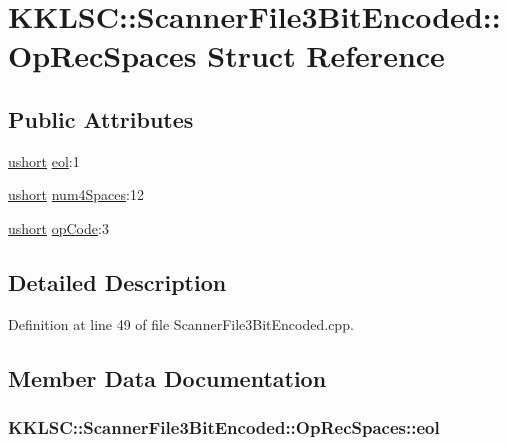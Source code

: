 \hypertarget{struct_scanner_file3_bit_encoded_1_1_op_rec_spaces}{}\section{K\+K\+L\+SC\+:\+:Scanner\+File3\+Bit\+Encoded\+:\+:Op\+Rec\+Spaces Struct Reference}
\label{struct_scanner_file3_bit_encoded_1_1_op_rec_spaces}
\subsection*{Public Attributes}
\begin{DoxyCompactItemize}
\item 
\hyperlink{namespace_k_k_b_a4a7e2d1bab49f38edf25c38a8dc20012}{ushort} \hyperlink{struct_scanner_file3_bit_encoded_1_1_op_rec_spaces_a4d5c1364eb376592c8ef8a034b5bb035}{eol}\+:1
\item 
\hyperlink{namespace_k_k_b_a4a7e2d1bab49f38edf25c38a8dc20012}{ushort} \hyperlink{struct_scanner_file3_bit_encoded_1_1_op_rec_spaces_a02cd8c9ab9c259c880cee43e42191ad8}{num4\+Spaces}\+:12
\item 
\hyperlink{namespace_k_k_b_a4a7e2d1bab49f38edf25c38a8dc20012}{ushort} \hyperlink{struct_scanner_file3_bit_encoded_1_1_op_rec_spaces_a5dd363615637cd86f604ee963e5665da}{op\+Code}\+:3
\end{DoxyCompactItemize}


\subsection{Detailed Description}


Definition at line 49 of file Scanner\+File3\+Bit\+Encoded.\+cpp.



\subsection{Member Data Documentation}
\subsubsection[{\texorpdfstring{eol}{eol}}]{ K\+K\+L\+S\+C\+::\+Scanner\+File3\+Bit\+Encoded\+::\+Op\+Rec\+Spaces\+::eol}\hypertarget{struct_scanner_file3_bit_encoded_1_1_op_rec_spaces_a4d5c1364eb376592c8ef8a034b5bb035}{}\label{struct_scanner_file3_bit_encoded_1_1_op_rec_spaces_a4d5c1364eb376592c8ef8a034b5bb035}


